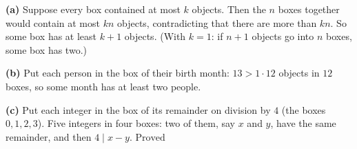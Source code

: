\textbf{(a)} Suppose every box contained at most $k$ objects. Then the $n$ boxes together would contain at most $kn$ objects, contradicting that there are more than $kn$. So some box has at least $k+1$ objects. (With $k=1$: if $n+1$ objects go into $n$ boxes, some box has two.)

\textbf{(b)} Put each person in the box of their birth month: $13>1\cdot12$ objects in $12$ boxes, so some month has at least two people.

\textbf{(c)} Put each integer in the box of its remainder on division by $4$ (the boxes $0,1,2,3$). Five integers in four boxes: two of them, say $x$ and $y$, have the same remainder, and then $4\mid x-y$. $\boxed{\text{Proved}}$
